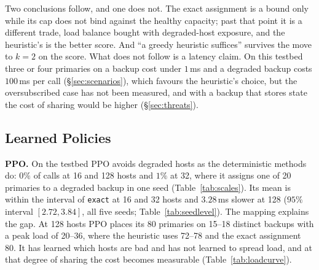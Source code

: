 \begin{table}[t]
\centering
\caption{Oversubscribed pools ($k = 2$), a quarter of the backups degraded,
mean of 30 seeds, structural. ``Deg.'' is the number of primaries assigned a
degraded backup; ``Load'' is the peak number of primaries on one backup.}
\label{tab:oversub}
\end{table}

Two conclusions follow, and one does not. The exact assignment is a bound only
while its cap does not bind against the healthy capacity; past that point it is
a different trade, load balance bought with degraded-host exposure, and the
heuristic's is the better score. And ``a greedy heuristic suffices'' survives
the move to $k = 2$ on the score. What does not follow is a latency claim. On
this testbed three or four primaries on a backup cost under $1$\,ms and a
degraded backup costs $100$\,ms per call (\S\ref{sec:scenarios}), which favours
the heuristic's choice, but the oversubscribed case has not been measured, and
with a backup that stores state the cost of sharing would be higher
(\S\ref{sec:threats}).

\subsection{Learned Policies}
\label{sec:rl128}

\textbf{PPO.} On the testbed PPO avoids degraded hosts as the deterministic
methods do: $0\%$ of calls at 16 and 128 hosts and $1\%$ at 32, where it assigns
one of 20 primaries to a degraded backup in one seed (Table~\ref{tab:scales}).
Its mean is within the interval of \texttt{exact} at 16 and 32 hosts and
$3.28$\,ms slower at 128 ($95\%$ interval $[2.72, 3.84]$, all five seeds;
Table~\ref{tab:seedlevel}). The mapping explains the gap. At 128 hosts PPO
places its 80 primaries on 15--18 distinct backups with a peak load of 20--36,
where the heuristic uses 72--78 and the exact assignment 80. It has learned
which hosts are bad and has not learned to spread load, and at that degree of
sharing the cost becomes measurable (Table~\ref{tab:loadcurve}).


